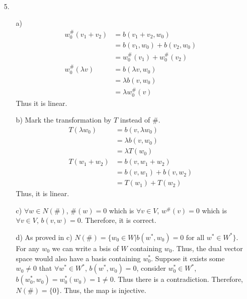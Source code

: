 \documentclass{article}
\begin{document}
\begin{itemize}
\begin{itemize}
\begin{align*}
        \end{align*}
    \end{itemize}
    \item [5.]
    \begin{itemize}
        \item [a)]
        \begin{align*}
            w_0^\#(v_1+v_2) &= b(v_1+v_2,w_0)\\
            &= b(v_1,w_0)+b(v_2,w_0)\\
            &= w_0^\#(v_1)+w_0^\#(v_2)\\
            w_0^\#(\lambda v)&= b(\lambda v,w_0)\\
            &= \lambda b(v,w_0)\\
            &=\lambda w_0^\#(v)
        \end{align*}
        Thus it is linear.
        \item [b)]
        Mark the transformation by \(T\) instead of \(\#\).\\
        \begin{align*}
            T(\lambda w_0)&=b(v,\lambda w_0)\\
            &=\lambda b(v,w_0)\\
            &=\lambda T(w_0)\\
            T(w_1+w_2)&=b(v,w_1+w_2)\\
            &=b(v,w_1)+b(v,w_2)\\
            &=T(w_1)+T(w_2)
        \end{align*}
        Thus, it is linear.
        \item [c)]
        \(\forall w\in N(\#)\), \(\#(w)=0\) which is \(\forall v\in V\), \(w^\#(v)=0\) which is \(\forall v \in V\), \(b(v,w)=0\). Therefore, it is correct.
        \item [d)]
        As proved in c) \(N(\#)=\{w_0\in W|b(w^*,w_0)=0 \text{ for all } w^*\in W^*\}\). For any \(w_0\) we can write a bsis of \(W\) containing \(w_0\). Thus, the dual vector space would also have a basis containing \(w_0^*\).
        Suppose it exists some \(w_0\neq 0\) that \(\forall w^*\in W^*\), \(b(w^*,w_0)=0\), consider \(w_0^*\in W^*\), \(b(w_0^*,w_0)=w_0^*(w_0)=1\neq 0\). Thus there is a contradiction. Therefore, \(N(\#)=\{0\}\). Thus, the map is injective.
    \end{itemize}
\end{itemize}
\end{document}
